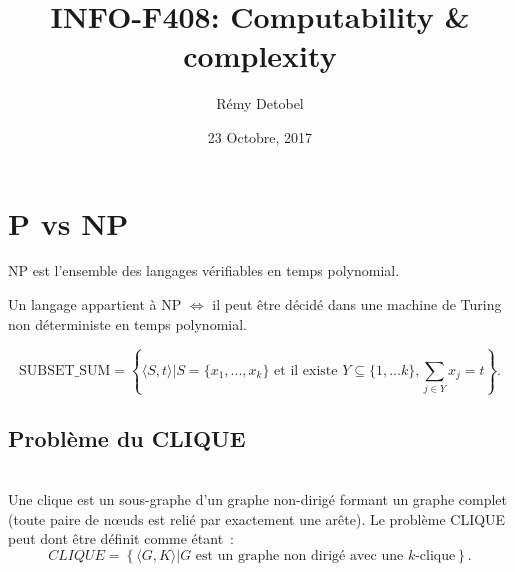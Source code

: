 \documentclass[a4paper,12pt]{article}
\title{INFO-F408: Computability \& complexity}
\date{23 Octobre, 2017}
\author{Rémy Detobel}
\begin{document}
\maketitle
\newpage

\section{P vs NP}
  \begin{defBox}
    NP est l'ensemble des langages vérifiables en temps polynomial.
  \end{defBox}
  \begin{theoremeBox}
    Un langage appartient à NP $\Leftrightarrow$ il peut être décidé dans une machine de Turing non déterministe en temps polynomial.
  \end{theoremeBox}

  $$\text{SUBSET\_SUM} = \left\{\langle S, t\rangle | S = \{x_1, ..., x_k\} \text{ et il existe } Y \subseteq \{1, ... k\}, \sum\limits_{j \in Y} x_j = t \right\}.$$

  \subsection{Problème du CLIQUE}
    \\
    Une clique est un sous-graphe d'un graphe non-dirigé formant un graphe complet (toute paire de nœuds est relié par exactement une arête).
		Le problème CLIQUE peut dont être définit comme étant~:
		\[CLIQUE = \left\{\langle G, K\rangle | G \text{ est un graphe non dirigé avec une $k$-clique}\right\}.\]
\end{document}
